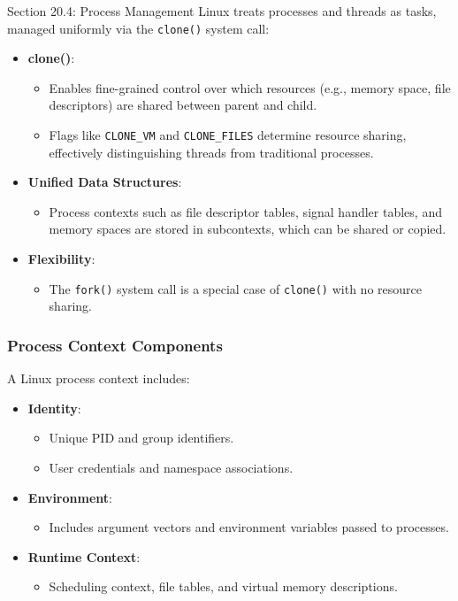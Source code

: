 \begin{notes}{Section 20.4: Process Management}
    Linux treats processes and threads as tasks, managed uniformly via the \texttt{clone()} system call:
    \begin{itemize}
        \item \textbf{clone()}:
        \begin{itemize}
            \item Enables fine-grained control over which resources (e.g., memory space, file descriptors) are shared between parent and child.
            \item Flags like \texttt{CLONE_VM} and \texttt{CLONE_FILES} determine resource sharing, effectively distinguishing threads from traditional processes.
        \end{itemize}
        \item \textbf{Unified Data Structures}:
        \begin{itemize}
            \item Process contexts such as file descriptor tables, signal handler tables, and memory spaces are stored in subcontexts, which can be shared or copied.
        \end{itemize}
        \item \textbf{Flexibility}:
        \begin{itemize}
            \item The \texttt{fork()} system call is a special case of \texttt{clone()} with no resource sharing.
        \end{itemize}
    \end{itemize}
    
    \subsubsection*{Process Context Components}
    
    A Linux process context includes:
    \begin{itemize}
        \item \textbf{Identity}:
        \begin{itemize}
            \item Unique PID and group identifiers.
            \item User credentials and namespace associations.
        \end{itemize}
        \item \textbf{Environment}:
        \begin{itemize}
            \item Includes argument vectors and environment variables passed to processes.
        \end{itemize}
        \item \textbf{Runtime Context}:
        \begin{itemize}
            \item Scheduling context, file tables, and virtual memory descriptions.
        \end{itemize}
    \end{itemize}
    

\end{notes}
